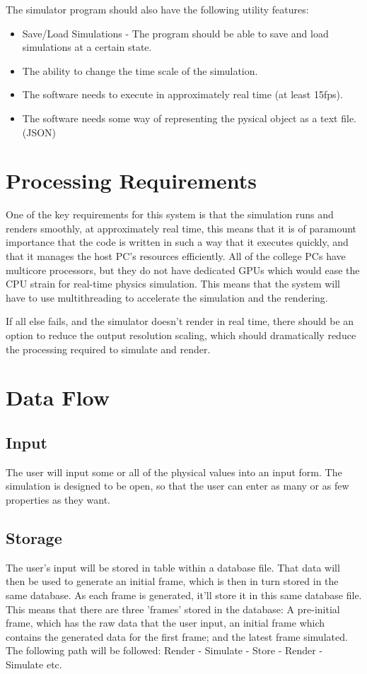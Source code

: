 The simulator program should also have the following utility features:
\begin{itemize}
	\item Save/Load Simulations - The program should be able to save and load simulations at a certain state.
	\item The ability to change the time scale of the simulation.
	\item The software needs to execute in approximately real time (at least 15fps).
	\item The software needs some way of representing the pysical object as a text file. (JSON)

\end{itemize}

\section{Processing Requirements}
One of the key requirements for this system is that the simulation runs and renders smoothly, at approximately real time, this means that it is of paramount importance that the code is written in such a way that it executes quickly, and that it manages the host PC's resources efficiently. All of the college PCs have multicore processors, but they do not have dedicated GPUs which would ease the CPU strain for real-time physics simulation. This means that the system will have to use multithreading to accelerate the simulation and the rendering.

If all else fails, and the simulator doesn't render in real time, there should be an option to reduce the output resolution scaling, which should dramatically reduce the processing required to simulate and render.

\section{Data Flow}
\subsection{Input}
	The user will input some or all of the physical values into an input form. The simulation is designed to be open, so that the user can enter as many or as few properties as they want.

\subsection{Storage}
	The user's input will be stored in table within a database file. That data will then be used to generate an initial frame, which is then in turn stored in the same database. As each frame is generated, it'll store it in this same database file. This means that there are three 'frames' stored in the database: A pre-initial frame, which has the raw data that the user input, an initial frame which contains the generated data for the first frame; and the latest frame simulated. The following path will be followed: Render - Simulate - Store - Render - Simulate etc.

